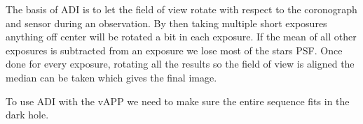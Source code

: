 The basis of \ac{ADI} is to let the field of view rotate with respect to the coronograph and sensor during an observation. By then taking multiple short exposures anything off center will be rotated a bit in each exposure. If the mean of all other exposures is subtracted from an exposure we lose most of the stars \ac{PSF}. Once done for every exposure, rotating all the results so the field of view is aligned the median can be taken which gives the final image.

To use \ac{ADI} with the \ac{vAPP} we need to make sure the entire sequence fits in the dark hole.
